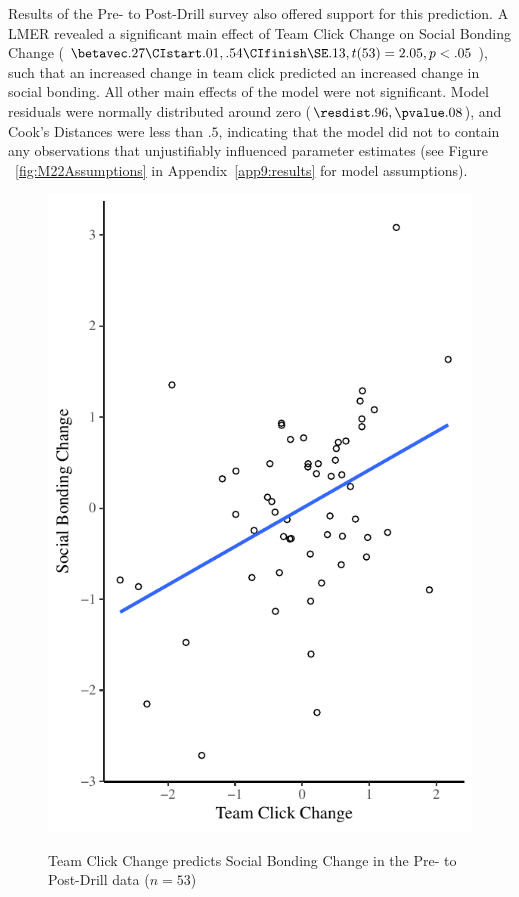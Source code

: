 \begin{CJK}{UTF8}{gbsn}
Results of the Pre- to Post-Drill survey also offered support for this prediction.  A LMER revealed a significant main effect of Team Click Change on Social Bonding Change ($\betavec .27 \CIstart .01, .54 \CIfinish \SE .13, t(53) = 2.05, p < .05$), such that an increased change in team click predicted an increased change in social bonding.  All other main effects of the model were not significant. Model residuals were normally distributed around zero ($\resdist .96, \pvalue .08$), and Cook's Distances were less than $.5$, indicating that the model did not to contain any observations that unjustifiably influenced parameter estimates (see Figure ~\ref{fig:M22Assumptions} in Appendix~\ref{app9:results} for model assumptions).






\begin{figure}
  \centering
    \includegraphics[width=0.5\linewidth,keepaspectratio] {images/groupClickBondingChangeCondition}
    \label{fig:groupClickBondingChangeCondition}
    \caption{Team Click Change predicts Social Bonding Change in the Pre- to Post-Drill data ($n = 53$)}
\end{figure}


\end{CJK}
